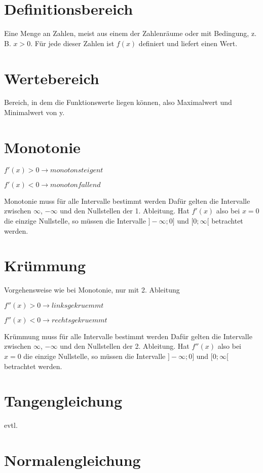 \documentclass[10pt,a4paper]{article}
\begin{document}
\section*{Definitionsbereich}
Eine Menge an Zahlen, meist aus einem der Zahlenräume oder mit Bedingung, z. B. $x > 0$. Für jede dieser Zahlen
ist $f(x)$ definiert und liefert einen Wert.

\section*{Wertebereich}
Bereich, in dem die Funktionswerte liegen können, also Maximalwert und Minimalwert von y.

\section*{Monotonie}
$f'(x) > 0 \rightarrow monoton steigent$

$f'(x) < 0 \rightarrow monoton fallend$

Monotonie muss für alle Intervalle bestimmt werden
Dafür gelten die Intervalle zwischen $\infty$, $-\infty$ und den Nullstellen der 1. Ableitung.
Hat $f'(x)$ also bei $x = 0$ die einzige Nullstelle, so müssen die Intervalle $]-\infty;0]$ und $[0;\infty[$
betrachtet werden.


\section*{Krümmung}
Vorgehensweise wie bei Monotonie, nur mit 2. Ableitung

$f''(x) > 0 \rightarrow links gekruemmt$

$f''(x) < 0 \rightarrow rechts gekruemmt$

Krümmung muss für alle Intervalle bestimmt werden
Dafür gelten die Intervalle zwischen $\infty$, $-\infty$ und den Nullstellen der 2. Ableitung.
Hat $f''(x)$ also bei $x = 0$ die einzige Nullstelle, so müssen die Intervalle $]-\infty;0]$ und $[0;\infty[$
betrachtet werden.

\section*{Tangengleichung}
evtl.

\section*{Normalengleichung}
\end{document}

